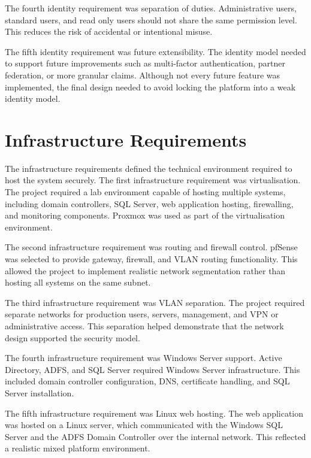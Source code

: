 The fourth identity requirement was separation of duties. Administrative users, standard users, and read only users should not share the same permission level. This reduces the risk of accidental or intentional misuse.

The fifth identity requirement was future extensibility. The identity model needed to support future improvements such as multi-factor authentication, partner federation, or more granular claims. Although not every future feature was implemented, the final design needed to avoid locking the platform into a weak identity model.


\section{Infrastructure Requirements}

The infrastructure requirements defined the technical environment required to host the system securely. The first infrastructure requirement was virtualisation. The project required a lab environment capable of hosting multiple systems, including domain controllers, SQL Server, web application hosting, firewalling, and monitoring components. Proxmox was used as part of the virtualisation environment.

The second infrastructure requirement was routing and firewall control. pfSense was selected to provide gateway, firewall, and VLAN routing functionality. This allowed the project to implement realistic network segmentation rather than hosting all systems on the same subnet.

The third infrastructure requirement was VLAN separation. The project required separate networks for production users, servers, management, and VPN or administrative access. This separation helped demonstrate that the network design supported the security model.

The fourth infrastructure requirement was Windows Server support. Active Directory, ADFS, and SQL Server required Windows Server infrastructure. This included domain controller configuration, DNS, certificate handling, and SQL Server installation.

The fifth infrastructure requirement was Linux web hosting. The web application was hosted on a Linux server, which communicated with the Windows SQL Server and the ADFS Domain Controller over the internal network. This reflected a realistic mixed platform environment.

